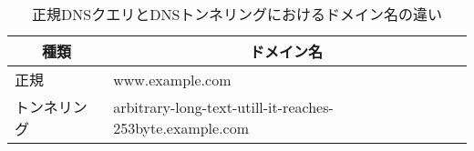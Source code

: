 \begin{table}[th]
 \caption{正規DNSクエリとDNSトンネリングにおけるドメイン名の違い}
 \centering
  \begin{tabular}{l|l}
    \toprule
		\multicolumn{1}{c}{\textbf{種類}} & \multicolumn{1}{c}{\textbf{ドメイン名}} \\
    \midrule
    正規 &  www.example.com \\ \hline
    トンネリング & arbitrary-long-text-utill-it-reaches-253byte.example.com\\
    \bottomrule
  \end{tabular}
 \label{tab:feature-tunnel}
\end{table}
